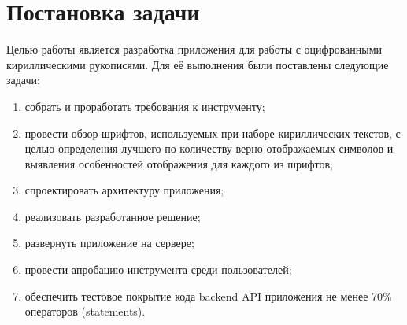 
\section{Постановка задачи}
\label{sec:task}

Целью работы является разработка приложения для работы с оцифрованными кириллическими рукописями. Для её выполнения были постав\-лены следующие задачи:
\begin{enumerate}
    \item собрать и проработать требования к инструменту;
    \item провести обзор шрифтов, используемых при наборе кириллических текстов, с целью определения лучшего по количеству верно отображаемых символов и выявления особенностей отображения для каждого из шрифтов;
    \item спроектировать архитектуру приложения;
    \item реализовать разработанное решение;
    \item развернуть приложение на сервере;
    \item провести апробацию инструмента среди пользователей;
    \item обеспечить тестовое покрытие кода backend API приложения не менее 70\% операторов (statements).
\end{enumerate}
